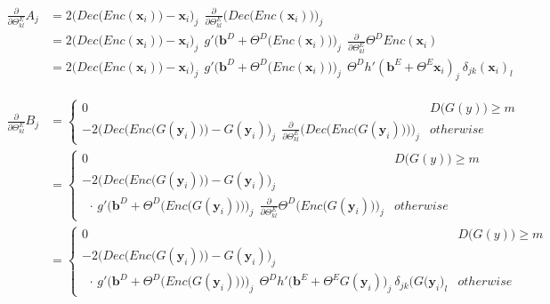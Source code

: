 \[
    \begin{split}
        \frac{\partial}{\partial \Theta^{E}_{kl}} A_{j}
        & = 2 \Big(Dec\big(Enc(\mathbf{x}_i)\big) - \mathbf{x}_{i}\Big)_{j} \:\: \frac{\partial}{\partial \Theta^{E}_{kl}}  \Big(Dec\big(Enc(\mathbf{x}_i)\big)\Big)_{j} \\[10pt]
        & = 2 \Big(Dec\big(Enc(\mathbf{x}_i)\big) - \mathbf{x}_{i}\Big)_{j} \:\: g'\Big(\mathbf{b}^{D} + \Theta^{D}\big(Enc(\mathbf{x}_{i})\big)\Big)_{j} \:\: \frac{\partial}{\partial \Theta^{E}_{kl}} \Theta^{D} Enc(\mathbf{x}_{i})\\[10pt]
        & = 2 \Big(Dec\big(Enc(\mathbf{x}_i)\big) - \mathbf{x}_{i}\Big)_{j} \:\: g'\Big(\mathbf{b}^{D} + \Theta^{D}\big(Enc(\mathbf{x}_{i})\big)\Big)_{j} \:\: \Theta^{D} h'(\mathbf{b}^{E} + \Theta^{E}\mathbf{x}_{i})_{j} \: \delta_{jk} (\mathbf{x}_{i})_{l}
    \end{split}
\]

\vspace{10pt}

\[
    \begin{split}
        \frac{\partial}{\partial \Theta^{E}_{kl}} B_{j}
        & =
        \begin{cases}
            0 & D\big(G(y)\big) \geq m \\
            - 2 \bigg(Dec\Big(Enc\big(G(\mathbf{y}_i)\big)\Big) - G(\mathbf{y}_{i})\bigg)_{j} \:\: \frac{\partial}{\partial \Theta^{E}_{kl}} \bigg(Dec\Big(Enc\big(G(\mathbf{y}_i)\big)\Big)\bigg)_{j} & otherwise
        \end{cases} \\[10pt]
        & =
        \begin{cases}
            0 & D\big(G(y)\big) \geq m \\
            - 2 \bigg(Dec\Big(Enc\big(G(\mathbf{y}_i)\big)\Big) - G(\mathbf{y}_{i})\bigg)_{j} \, \\ \;\, \cdot \, g'\bigg(\mathbf{b}^{D} + \Theta^{D}\Big(Enc\big(G(\mathbf{y}_{i})\big)\Big)\bigg)_{j} \:\: \frac{\partial}{\partial \Theta^{E}_{kl}} \Theta^{D} \Big(Enc\big(G(\mathbf{y}_{i})\big)\Big)_{j}& otherwise
        \end{cases}\\[10pt]
        & = 
        \begin{cases}
            0 & D\big(G(y)\big) \geq m \\
            - 2 \bigg(Dec\Big(Enc\big(G(\mathbf{y}_i)\big)\Big) - G(\mathbf{y}_{i})\bigg)_{j} \, \\ \;\, \cdot \, g'\bigg(\mathbf{b}^{D} + \Theta^{D}\Big(Enc\big(G(\mathbf{y}_{i})\big)\Big)\bigg)_{j} \:\: \Theta^{D} h'\big(\mathbf{b}^{E} + \Theta^{E}G(\mathbf{y}_{i})\big)_{j} \: \delta_{jk} \big(G(\mathbf{y}_{i}\big)_{l} & otherwise
        \end{cases}
    \end{split}
\]

